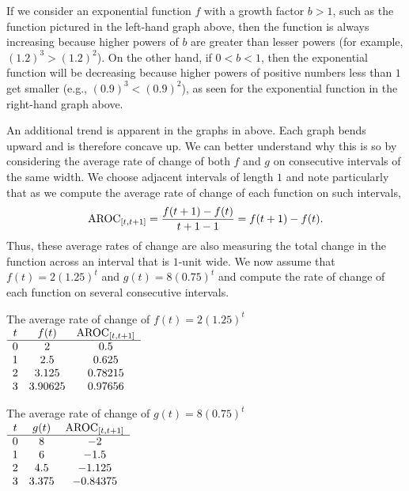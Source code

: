 \documentclass[nooutcomes]{ximera}
\begin{document}
If we consider an exponential function $f$ with a growth factor $b > 1$, such as the function pictured in the left-hand graph above, then the function is always increasing because higher powers of $b$ are greater than lesser powers (for example, $(1.2)^3 > (1.2)^2$).  On the other hand, if $0 < b < 1$, then the exponential function will be decreasing because higher powers of positive numbers less than $1$ get smaller (e.g., $(0.9)^3 < (0.9)^2$), as seen for the exponential function in the right-hand graph above.

An additional trend is apparent in the graphs in above.  Each graph bends upward and is therefore concave up.  We can better understand why this is so by considering the average rate of change of both $f$ and $g$ on consecutive intervals of the same width.  We choose adjacent intervals of length $1$ and note particularly that as we compute the average rate of change of each function on such intervals,%
\begin{equation*}
\mathrm{AROC}_{[t,t+1]} = \frac{f(t+1) - f(t)}{t+1-1} = f(t+1) - f(t)\text{.}
\end{equation*}
Thus, these average rates of change are also measuring the total change in the function across an interval that is $1$-unit wide. We now assume that $f(t) = 2 (1.25)^t$ and $g(t) = 8(0.75)^t$ and compute the rate of change of each function on several consecutive intervals.


\begin{center}
The average rate of change of  $f(t) = 2(1.25)^t$ \\
$
{\begin{array}{ccc}
t&f(t)&\av_{[t,t+1]}\\
\hline
0&2&0.5\\
1&2.5&0.625\\
2&3.125&0.78215\\
3&3.90625&0.97656
\end{array}}%
$
\end{center}
\begin{center}
The average rate of change of  $g(t) = 8(0.75)^t$\\
$
{\begin{array}{ccc}
t&g(t)&\av_{[t,t+1]}\\
\hline
0&8&-2\\
1&6&-1.5\\
2&4.5&-1.125\\
3&3.375&-0.84375
\end{array}}%
$
\end{center}
\end{document}
